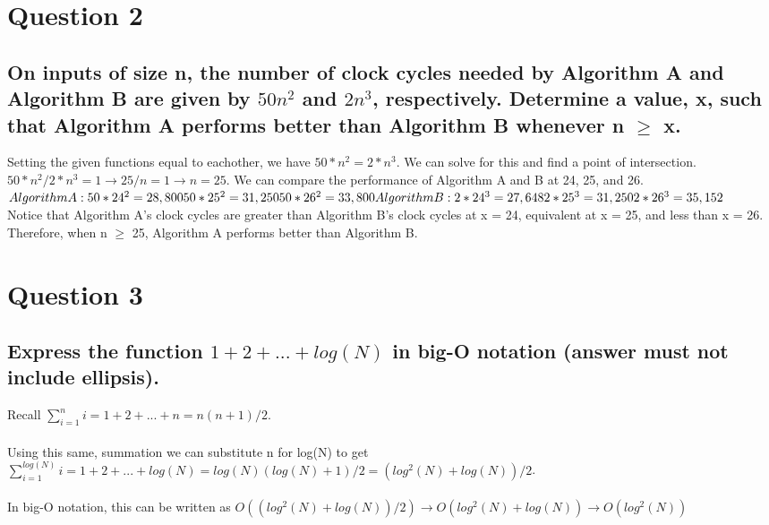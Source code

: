 \documentclass[11pt]{article}
\begin{document}
\section{Question 2}
\subsection{On inputs of size n, the number of clock cycles needed by Algorithm A and Algorithm B are given by $ 50n^2 $ and $ 2n^3 $, respectively. Determine a value, x, such that Algorithm A performs better than Algorithm B whenever n $\geq$ x. }

Setting the given functions equal to eachother, we have $50*n^2 = 2*n^3$. We can solve for this and find a point of intersection. $50*n^2 / 2*n^3 = 1 \rightarrow 25/n = 1 \rightarrow n = 25$. We can compare the performance of Algorithm A and B at 24, 25, and 26. \\$Algorithm A:\\50*24^2 = 28,800\\50*25^2 = 31,250\\50*26^2 = 33,800\\Algorithm B:\\2*24^3=27,648\\2*25^3=31,250\\2*26^3=35,152\\$\\Notice that Algorithm A's clock cycles are greater than Algorithm B's clock cycles at x = 24, equivalent at x = 25, and less than x = 26. Therefore, when n $\geq$ 25, Algorithm A performs better than Algorithm B.

\section{Question 3}
\subsection{Express the function $ 1 + 2 + ... + log(N) $ in big-O notation (answer must not include ellipsis).}

Recall $\sum_{i=1}^{n} i = 1 + 2 + ... + n = n(n +1)/2$. \\\\Using this same, summation we can substitute n for log(N) to get $\sum_{i=1}^{log(N)} i = 1 + 2 + ... + log(N) = log(N)(log(N)+1)/2 = (log^2(N)+log(N))/2$. \\\\In big-O notation, this can be written as $O((log^2(N)+log(N))/2) \rightarrow O(log^2(N)+log(N)) \rightarrow O(log^2(N))$
\end{document}
